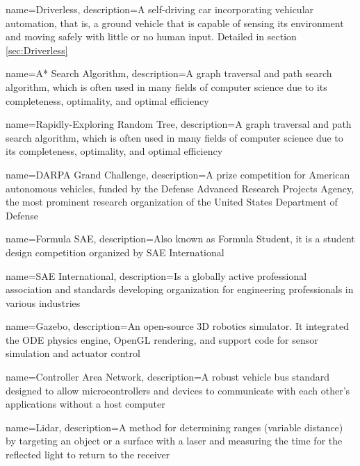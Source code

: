 {
    name=Driverless,
    description={A self-driving car incorporating vehicular automation, that is, a ground vehicle that is capable of sensing its environment and moving safely with little or no human input. Detailed in section \ref{sec:Driverless}}
}

{
    name=A* Search Algorithm,
    description={A graph traversal and path search algorithm, which is often used in many fields of computer science due to its completeness, optimality, and optimal efficiency \cite{artificial_intelligence_a_modern_approach}}
}

{
    name=Rapidly-Exploring Random Tree,
    description={A graph traversal and path search algorithm, which is often used in many fields of computer science due to its completeness, optimality, and optimal efficiency \cite{exploring_random_trees} \cite{randomized_kinodynamic_planning}}
}

{
    name=DARPA Grand Challenge,
    description={A prize competition for American autonomous vehicles, funded by the Defense Advanced Research Projects Agency, the most prominent research organization of the United States Department of Defense \cite{darpa_grand_challenge_online}}
}

{
    name=Formula SAE,
    description={Also known as Formula Student, it is a student design competition organized by SAE International \cite{sae_student_events}}
}

{
    name=SAE International,
    description={Is a globally active professional association and standards developing organization for engineering professionals in various industries \cite{formula_sae}}
}

{
    name=Gazebo,
    description={An open-source 3D robotics simulator. It integrated the ODE physics engine, OpenGL rendering, and support code for sensor simulation and actuator control \cite{gazebo_simulator}}
}

{
    name=Controller Area Network,
    description={A robust vehicle bus standard designed to allow microcontrollers and devices to communicate with each other's applications without a host computer \cite{history_of_can_technology}}
}

{
    name=Lidar,
    description={A method for determining ranges (variable distance) by targeting an object or a surface with a laser and measuring the time for the reflected light to return to the receiver \cite{what_is_lidar}}
}

